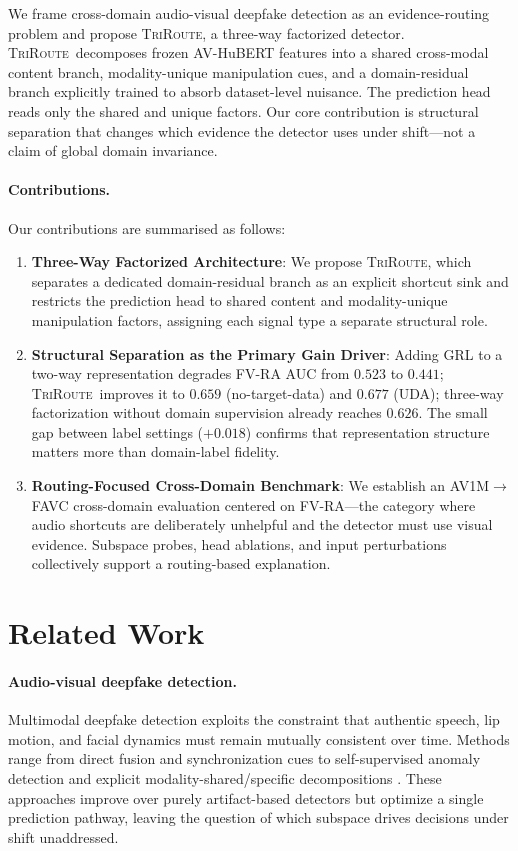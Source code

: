 \documentclass{article}
\newcommand{\method}{\textsc{TriRoute}}
\begin{document}
We frame cross-domain audio-visual deepfake detection as an evidence-routing problem and propose \method, a three-way factorized detector. \method\ decomposes frozen AV-HuBERT features into a shared cross-modal content branch, modality-unique manipulation cues, and a domain-residual branch explicitly trained to absorb dataset-level nuisance. The prediction head reads only the shared and unique factors. Our core contribution is structural separation that changes which evidence the detector uses under shift---not a claim of global domain invariance.

\paragraph{Contributions.} Our contributions are summarised as follows:
\begin{enumerate}
\item \textbf{Three-Way Factorized Architecture}: We propose \method, which separates a dedicated domain-residual branch as an explicit shortcut sink and restricts the prediction head to shared content and modality-unique manipulation factors, assigning each signal type a separate structural role.
\item \textbf{Structural Separation as the Primary Gain Driver}: Adding GRL to a two-way representation degrades FV-RA AUC from $0.523$ to $0.441$; \method\ improves it to $0.659$ (no-target-data) and $0.677$ (UDA); three-way factorization without domain supervision already reaches $0.626$. The small gap between label settings ($+0.018$) confirms that representation structure matters more than domain-label fidelity.
\item \textbf{Routing-Focused Cross-Domain Benchmark}: We establish an AV1M$\rightarrow$FAVC cross-domain evaluation centered on FV-RA---the category where audio shortcuts are deliberately unhelpful and the detector must use visual evidence. Subspace probes, head ablations, and input perturbations collectively support a routing-based explanation.
\end{enumerate}

\section{Related Work}

\paragraph{Audio-visual deepfake detection.}
Multimodal deepfake detection exploits the constraint that authentic speech, lip motion, and facial dynamics must remain mutually consistent over time. Methods range from direct fusion and synchronization cues \citep{zhou2021jointav, chung2016syncnet} to self-supervised anomaly detection and explicit modality-shared/specific decompositions \citep{feng2023avad, liang2024speechforensics, smeu2025avhalign, du2025cad}. These approaches improve over purely artifact-based detectors but optimize a single prediction pathway, leaving the question of which subspace drives decisions under shift unaddressed.
\end{document}
